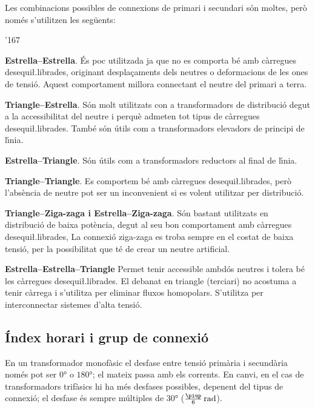 Les combinacions possibles de connexions de primari i secundari s\'{o}n moltes, per\`{o} nom\'{e}s s'utilitzen les seg\"{u}ents:
\begin{dinglist}{'167}
   \item \textbf{Estrella--Estrella}. \'{E}s poc utilitzada ja que no es comporta b\'{e} amb c\`{a}rregues desequi{\l.l}ibrades, originant despla\c{c}aments dels neutres o deformacions de les ones de tensi\'{o}. Aquest comportament millora connectant el neutre del primari a terra.
   \item \textbf{Triangle--Estrella}. S\'{o}n molt utilitzats con a transformadors de distribuci\'{o} degut a la accessibilitat del neutre i perqu\`{e} admeten tot tipus de c\`{a}rregues desequi{\l.l}ibrades. Tamb\'{e} s\'{o}n \'{u}tils com a transformadors elevadors de principi de l\'{\i}nia.
   \item \textbf{Estrella--Triangle}. S\'{o}n \'{u}tils com a transformadors reductors al final de l\'{\i}nia.
   \item \textbf{Triangle--Triangle}. Es comportem b\'{e} amb c\`{a}rregues desequi{\l.l}ibrades, per\`{o} l'abs\`{e}ncia de neutre pot ser un inconvenient si es volent utilitzar per distribuci\'{o}.
   \item \textbf{Triangle--Ziga-zaga i Estrella--Ziga-zaga}. S\'{o}n bastant utilitzats en distribuci\'{o} de baixa pot\`{e}ncia, degut al seu bon comportament amb c\`{a}rregues desequi{\l.l}ibrades, La connexi\'{o} ziga-zaga es troba sempre en el costat de baixa tensi\'{o}, per la possibilitat que t\'{e} de crear un neutre artificial.
   \item \textbf{Estrella--Estrella--Triangle} Permet tenir accessible ambd\'{o}s  neutres i tolera  b\'{e} les c\`{a}rregues  desequi{\l.l}ibrades. El debanat en triangle (terciari) no acostuma a tenir c\`{a}rrega i s'utilitza per eliminar fluxos homopolars. S'utilitza per interconnectar sistemes d'alta tensi\'{o}.
\end{dinglist}


\subsection{\'{I}ndex horari i grup de connexi\'{o}}\label{sec:connex-index-horari}

En un transformador monof\`{a}sic el desfase entre tensi\'{o} prim\`{a}ria i secund\`{a}ria nom\'{e}s pot ser $0\unit{\degree}$ o $180\unit{\degree}$; el mateix passa amb els corrents. En canvi, en el cas de transformadors trif\`{a}sics hi ha m\'{e}s desfases possibles, depenent del tipus de connexi\'{o}; el desfase \'{e}s sempre m\'{u}ltiples de $30\unit{\degree}$ ($\frac{\piup}{6}\unit{rad}$).

